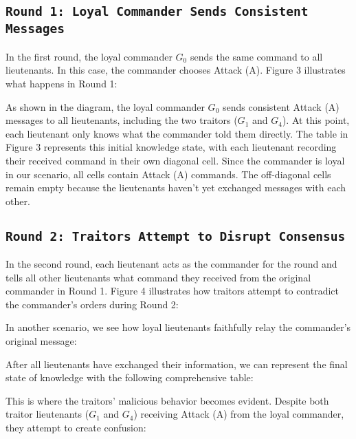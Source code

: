 \documentclass[11pt]{article}
\newcommand{\gen}[1]{\ensuremath{G_{#1}}}
\begin{document}
\subsection*{\texttt{\large Round 1: Loyal Commander Sends Consistent Messages}}
\justifying
In the first round, the loyal commander $\gen{0}$ sends the same command to all lieutenants. In this case, the commander chooses Attack (A). Figure 3 illustrates what happens in Round 1:



\justifying
As shown in the diagram, the loyal commander $\gen{0}$ sends consistent Attack (A) messages to all lieutenants, including the two traitors ($\gen{1}$ and $\gen{4}$).
At this point, each lieutenant only knows what the commander told them directly. The table in Figure 3 represents this initial knowledge state, with each lieutenant recording their received command in their own diagonal cell. Since the commander is loyal in our scenario, all cells contain Attack (A) commands. The off-diagonal cells remain empty because the lieutenants haven't yet exchanged messages with each other.

\subsection*{\texttt{\large Round 2: Traitors Attempt to Disrupt Consensus}}
\justifying
In the second round, each lieutenant acts as the commander for the round and tells all other lieutenants what command they received from the original commander in Round 1.
Figure 4 illustrates how traitors attempt to contradict the commander's orders during Round 2:




\justifying
In another scenario, we see how loyal lieutenants faithfully relay the commander's original message:



\justifying
After all lieutenants have exchanged their information, we can represent the final state of knowledge with the following comprehensive table:



\justifying
This is where the traitors' malicious behavior becomes evident. Despite both traitor lieutenants ($\gen{1}$ and $\gen{4}$) receiving Attack (A) from the loyal commander, they attempt to create confusion:
\end{document}
